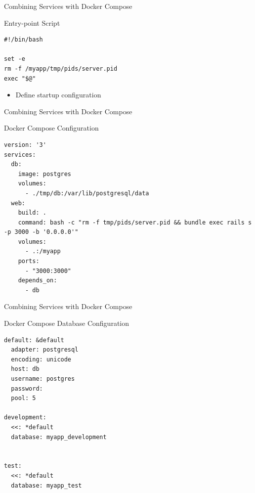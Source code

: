 \documentclass[10pt, compress, aspectratio=169, xcolor={table,usenames,dvipsnames}]{beamer}
\begin{document}
\begin{frame}[label={sec:org94587e1},fragile]{Combining Services with Docker Compose}
 \begin{block}{Entry-point Script}
\lstset{language=bash,label= ,caption= ,captionpos=b,numbers=none}
\begin{lstlisting}
#!/bin/bash

set -e
rm -f /myapp/tmp/pids/server.pid
exec "$@"
\end{lstlisting}

\begin{itemize}
\item Define \alert{startup configuration}
\end{itemize}
\end{block}
\end{frame}
\begin{frame}[label={sec:orgb448367},fragile]{Combining Services with Docker Compose}
 \begin{block}{Docker Compose Configuration}
\lstset{language=yaml,label= ,caption= ,captionpos=b,numbers=none}
\begin{lstlisting}
version: '3'
services:
  db:
    image: postgres
    volumes:
      - ./tmp/db:/var/lib/postgresql/data
  web:
    build: .
    command: bash -c "rm -f tmp/pids/server.pid && bundle exec rails s -p 3000 -b '0.0.0.0'"
    volumes:
      - .:/myapp
    ports:
      - "3000:3000"
    depends_on:
      - db
\end{lstlisting}
\end{block}
\end{frame}
\begin{frame}[label={sec:org2995109},fragile]{Combining Services with Docker Compose}
 \begin{block}{Docker Compose Database Configuration}
\lstset{language=yaml,label= ,caption= ,captionpos=b,numbers=none}
\begin{lstlisting}
default: &default
  adapter: postgresql
  encoding: unicode
  host: db
  username: postgres
  password:
  pool: 5

development:
  <<: *default
  database: myapp_development


test:
  <<: *default
  database: myapp_test
\end{lstlisting}
\end{block}
\end{frame}
\end{document}
